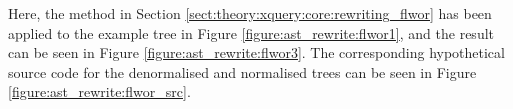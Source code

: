 Here, the method in Section \ref{sect:theory:xquery:core:rewriting_flwor} has
been applied to the example tree in Figure \ref{figure:ast_rewrite:flwor1},
and the result can be seen in Figure \ref{figure:ast_rewrite:flwor3}. The
corresponding hypothetical source code for the denormalised and normalised trees
can be seen in Figure \ref{figure:ast_rewrite:flwor_src}.
\begin{figure}[!h]
	\centering
		\quad
\end{figure}

